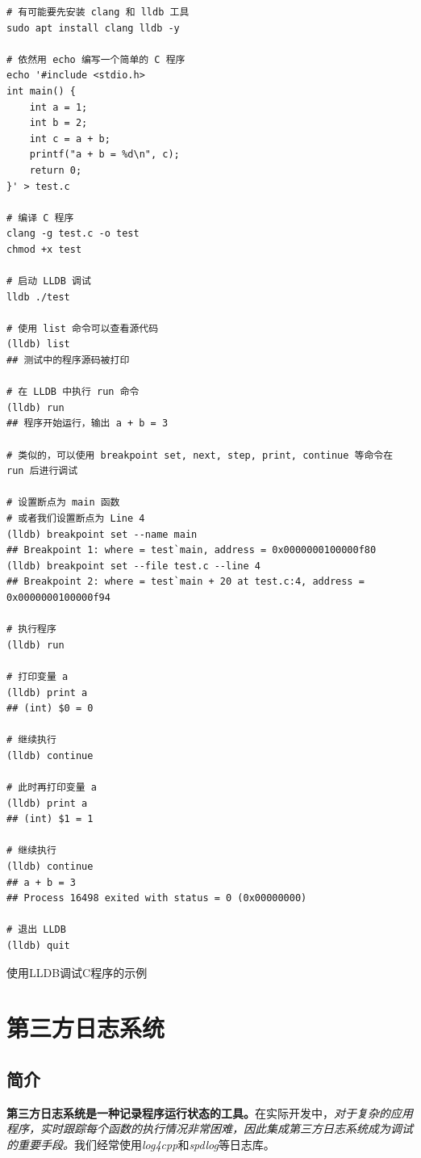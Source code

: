 \begin{longlisting}
    \begin{verbatim}
# 有可能要先安装 clang 和 lldb 工具
sudo apt install clang lldb -y

# 依然用 echo 编写一个简单的 C 程序
echo '#include <stdio.h>
int main() {
    int a = 1;
    int b = 2;
    int c = a + b;
    printf("a + b = %d\n", c);
    return 0;
}' > test.c

# 编译 C 程序
clang -g test.c -o test
chmod +x test

# 启动 LLDB 调试
lldb ./test

# 使用 list 命令可以查看源代码
(lldb) list
## 测试中的程序源码被打印

# 在 LLDB 中执行 run 命令
(lldb) run
## 程序开始运行，输出 a + b = 3

# 类似的，可以使用 breakpoint set, next, step, print, continue 等命令在 run 后进行调试

# 设置断点为 main 函数
# 或者我们设置断点为 Line 4
(lldb) breakpoint set --name main
## Breakpoint 1: where = test`main, address = 0x0000000100000f80
(lldb) breakpoint set --file test.c --line 4
## Breakpoint 2: where = test`main + 20 at test.c:4, address = 0x0000000100000f94

# 执行程序
(lldb) run

# 打印变量 a
(lldb) print a
## (int) $0 = 0

# 继续执行
(lldb) continue

# 此时再打印变量 a
(lldb) print a
## (int) $1 = 1

# 继续执行
(lldb) continue
## a + b = 3
## Process 16498 exited with status = 0 (0x00000000)

# 退出 LLDB
(lldb) quit
    \end{verbatim}
    \caption{使用LLDB调试C程序的示例}
    \label{listing:lldb}
\end{longlisting}

\section{第三方日志系统}

\subsection{简介}

\textbf{第三方日志系统是一种记录程序运行状态的工具。}在实际开发中，\textit{对于复杂的应用程序，实时跟踪每个函数的执行情况非常困难，因此集成第三方日志系统成为调试的重要手段。}我们经常使用\textit{log4cpp}和\textit{spdlog}等日志库。\\

